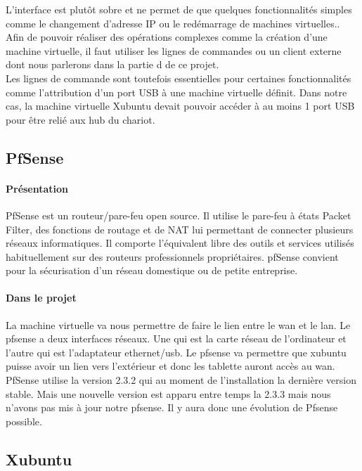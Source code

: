 \documentclass[a4paper,12pt]{article}
\begin{document}
L’interface est plutôt sobre et ne permet de que quelques fonctionnalités simples comme le changement d’adresse IP ou le redémarrage de machines virtuelles.. Afin de pouvoir réaliser des opérations complexes comme la création d’une machine virtuelle, il faut utiliser les lignes de commandes ou un client externe dont nous parlerons dans la partie d de ce projet.\\

Les lignes de commande sont toutefois essentielles pour certaines fonctionnalités comme l’attribution d’un port USB à une machine virtuelle définit. Dans notre cas, la machine virtuelle Xubuntu devait pouvoir accéder à au moins 1 port USB pour être relié aux hub du chariot.

\subsection{PfSense}
\paragraph{Présentation\\}

PfSense est un routeur/pare-feu open source. Il utilise le pare-feu à états Packet Filter, des fonctions de routage et de NAT lui permettant de connecter plusieurs réseaux informatiques. Il comporte l'équivalent libre des outils et services utilisés habituellement sur des routeurs professionnels propriétaires. pfSense convient pour la sécurisation d'un réseau domestique ou de petite entreprise.


\paragraph{Dans le projet\\}

La machine virtuelle va nous permettre de faire le lien entre le wan et le lan. Le pfsense a deux interfaces réseaux. Une qui est la carte réseau de l’ordinateur et l’autre qui est l’adaptateur ethernet/usb. Le pfsense va permettre que xubuntu puisse avoir un lien vers l’extérieur et donc les tablette auront accès au wan. \\
PfSense utilise la version 2.3.2 qui au moment de l’installation la dernière version stable. Mais une nouvelle version est apparu entre temps la 2.3.3 mais nous n’avons pas mis à jour notre pfsense. Il y aura donc une évolution de Pfsense possible.

\subsection{Xubuntu}
\end{document}
